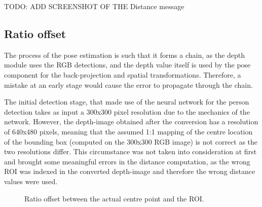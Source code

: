 TODO: ADD SCREENSHOT OF THE Distance message
\clearpage

\subsection{Ratio offset}

The process of the pose estimation is such that it forms a chain, as the depth module uses the RGB detections, and the depth value itself is used by the pose component for the back-projection and spatial transformations. Therefore, a mistake at an early stage would cause the error to propagate through the chain.

The initial detection stage, that made use of the neural network for the person detection takes as input a 300x300 pixel resolution due to the mechanics of the network. However, the depth-image obtained after the conversion has a resolution of 640x480 pixels, meaning that the assumed 1:1 mapping of the centre location of the bounding box (computed on the 300x300 RGB image) is not correct as the two resolutions differ. This circumstance was not taken into consideration at first and brought some meaningful errors in the distance computation, as the wrong ROI was indexed in the converted depth-image and therefore the wrong distance values were used.

\begin{figure}[H]
    \centering
    \qquad
    \caption{Ratio offset between the actual centre point and the ROI.}%
    \label{fig:ration}%
\end{figure}

